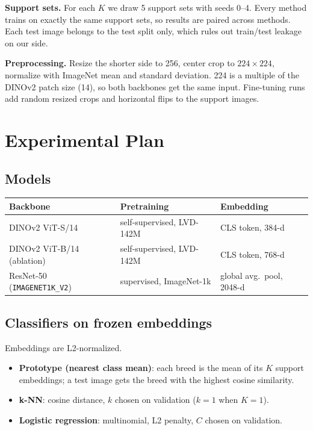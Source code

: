 \documentclass[11pt]{article}
\begin{document}
\textbf{Support sets.} For each $K$ we draw 5 support sets with seeds 0--4.
Every method trains on exactly the same support sets, so results are paired
across methods. Each test image belongs to the test split only, which rules out
train/test leakage on our side.

\textbf{Preprocessing.} Resize the shorter side to 256, center crop to
$224 \times 224$, normalize with ImageNet mean and standard deviation.
224 is a multiple of the DINOv2 patch size (14), so both backbones get the same input.
Fine-tuning runs add random resized crops and horizontal flips to the support images.

\section{Experimental Plan}

\subsection{Models}

\smallskip
\begin{tabular}{@{}lll@{}}
\toprule
Backbone & Pretraining & Embedding \\
\midrule
DINOv2 ViT-S/14 & self-supervised, LVD-142M & CLS token, 384-d \\
DINOv2 ViT-B/14 (ablation) & self-supervised, LVD-142M & CLS token, 768-d \\
ResNet-50 (\texttt{IMAGENET1K\_V2}) & supervised, ImageNet-1k & global avg.\ pool, 2048-d \\
\bottomrule
\end{tabular}
\smallskip

\subsection{Classifiers on frozen embeddings}

Embeddings are L2-normalized.
\begin{itemize}
    \item \textbf{Prototype (nearest class mean)}: each breed is the mean of its
          $K$ support embeddings; a test image gets the breed with the highest cosine similarity.
    \item \textbf{k-NN}: cosine distance, $k$ chosen on validation ($k=1$ when $K=1$).
    \item \textbf{Logistic regression}: multinomial, L2 penalty, $C$ chosen on validation.
\end{itemize}
\end{document}

